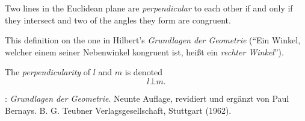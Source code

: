 \documentclass[12pt]{article}
\theoremstyle{definition}
\begin{document}
Two lines in the Euclidean plane are {\em perpendicular} to each other if and only if they intersect and two of the angles they form are congruent. 

This definition  on the one in Hilbert's {\em Grundlagen der Geometrie} (``Ein Winkel, welcher einem seiner Nebenwinkel kongruent ist, hei\ss t ein {\em rechter Winkel}'').

The {\em perpendicularity} of $l$ and $m$ is denoted 
                         $$l \bot m.$$

\begin{thebibliography}{8}
: {\em Grundlagen der Geometrie}. Neunte Auflage, revidiert und erg\"anzt von Paul Bernays.\;  B. G. Teubner Verlagsgesellschaft, Stuttgart (1962).
\end{thebibliography} 


\end{document}
